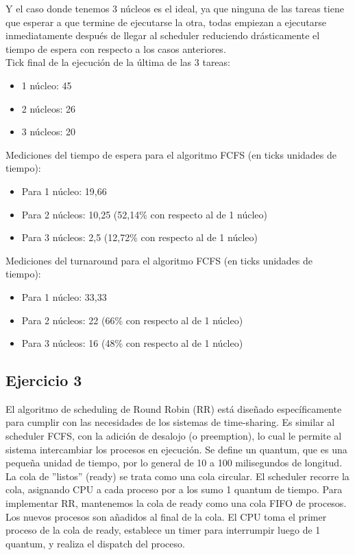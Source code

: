 Y el caso donde tenemos 3 núcleos es el ideal, ya que ninguna de las tareas tiene que esperar a que termine de ejecutarse la otra, todas empiezan a ejecutarse inmediatamente después de llegar al scheduler reduciendo drásticamente el tiempo de espera con respecto a los casos anteriores. \\

\noindent
Tick final de la ejecución de la última de las 3 tareas:
\begin{itemize}
	\item 1 núcleo: 45
	\item 2 núcleos: 26
	\item 3 núcleos: 20
\end{itemize}

\noindent
Mediciones del tiempo de espera para el algoritmo FCFS (en ticks unidades de tiempo):
\begin{itemize}
	\item Para 1 núcleo: 19,66
	\item Para 2 núcleos: 10,25 (52,14\% con respecto al de 1 núcleo)
	\item Para 3 núcleos: 2,5 (12,72\% con respecto al de 1 núcleo)
\end{itemize}

\noindent
Mediciones del turnaround para el algoritmo FCFS (en ticks unidades de tiempo):
\begin{itemize}
	\item Para 1 núcleo: 33,33
	\item Para 2 núcleos: 22 (66\% con respecto al de 1 núcleo)
	\item Para 3 núcleos: 16 (48\% con respecto al de 1 núcleo)
\end{itemize}


\subsection{Ejercicio 3}

\noindent

El algoritmo de scheduling de Round Robin\cite{silberschatz2009operating} (RR) está diseñado específicamente para cumplir con las necesidades de los sistemas de time-sharing. Es similar al scheduler FCFS, con la adición de desalojo (o preemption), lo cual le permite al sistema intercambiar los procesos en ejecución. Se define un quantum, que es una pequeña unidad de tiempo, por lo general de 10 a 100 milisegundos de longitud. La cola de ''listos'' (ready) se trata como una cola circular. El scheduler recorre la cola, asignando CPU a cada proceso por a los sumo 1 quantum de tiempo.
Para implementar RR, mantenemos la cola de ready como una cola FIFO de procesos. Los nuevos procesos son añadidos al final de la cola.  El CPU toma el primer proceso de la cola de ready, establece un timer para interrumpir luego de 1 quantum, y realiza el dispatch del proceso. \\

